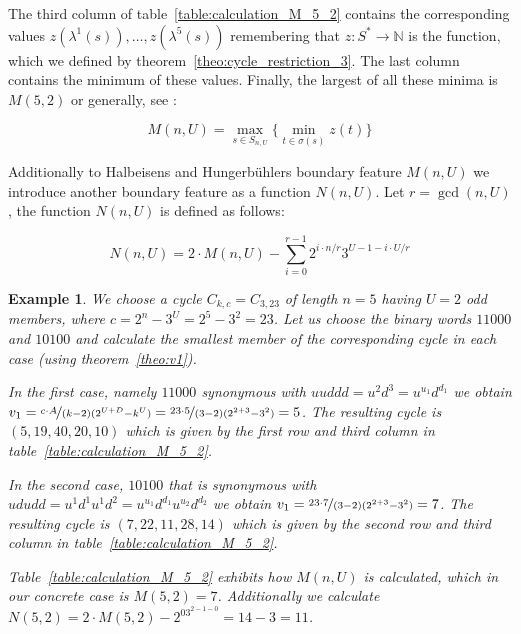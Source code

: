 \documentclass[12pt]{amsart}
\newtheorem{example}[theorem]{Example}
\theoremstyle{definition}
\begin{document}
The third column of table~\ref{table:calculation_M_5_2} contains the corresponding values $z(\lambda^1(s)),\ldots,z(\lambda^5(s))$ remembering that $z:S^\ast\rightarrow\mathbb{N}$ is the function, which we defined by theorem~\ref{theo:cycle_restriction_3}. The last column contains the minimum of these values. Finally, the largest of all these minima is $M(5,2)$ or generally, see \cite{Ref_Halbeisen_Hungerbuehler_1997}:

\begin{equation}
\label{eq:M_n_U}
M(n,U)=\max_{s\in S_{n,U}}\{\min_{t\in\sigma(s)}z(t)\}
\end{equation}

Additionally to Halbeisens and Hungerbühlers boundary feature $M(n,U)$ we introduce another boundary feature as a function $N(n,U)$. Let $r=\gcd(n, U)$, the function $N(n,U)$ is defined as follows:

\begin{equation}
\label{eq:N_n_U}
N(n,U)=2\cdot M(n,U)-\sum_{i=0}^{r-1}2^{i\cdot n/r}3^{U-1-i\cdot U/r}
\end{equation}

\begin{example}
\label{ex:M_N}
We choose a cycle $C_{k,c}=C_{3,23}$ of length $n=5$ having $U=2$ odd members, where $c=2^n-3^U=2^5-3^2=23$. Let us choose the binary words $11000$ and $10100$ and calculate the smallest member of the corresponding cycle in each case (using theorem~\ref{theo:v1}).

In the first case, namely $11000$ synonymous with $uuddd=u^2d^3=u^{u_1}d^{d_1}$ we obtain $v_1=\nicefrac{c\cdot A}{(k-2)(2^{U+D}-k^U)}=\nicefrac{23\cdot 5}{(3-2)(2^{2+3}-3^2)}=5$. The resulting cycle is $(5,19,40,20,10)$ which is given by the first row and third column in table~\ref{table:calculation_M_5_2}.

In the second case, $10100$ that is synonymous with $ududd=u^1d^1u^1d^2=u^{u_1}d^{d_1}u^{u_2}d^{d_2}$ we obtain $v_1=\nicefrac{23\cdot 7}{(3-2)(2^{2+3}-3^2)}=7$. The resulting cycle is $(7,22,11,28,14)$ which is given by the second row and third column in table~\ref{table:calculation_M_5_2}.

Table~\ref{table:calculation_M_5_2} exhibits how $M(n,U)$ is calculated, which in our concrete case is $M(5,2)=7$. Additionally we calculate $N(5,2)=2\cdot M(5,2)-2^03^{2-1-0}=14-3=11$.
\end{example}
\end{document}
